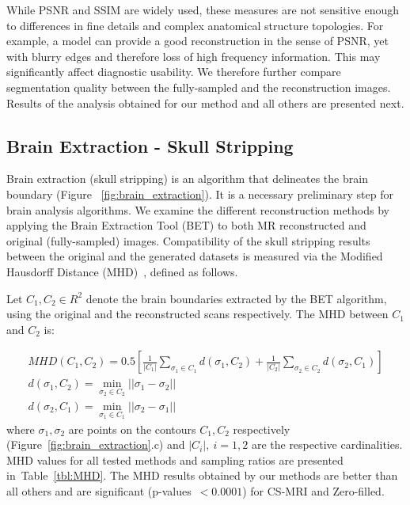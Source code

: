 \documentclass[review]{elsarticle}
\begin{document}
While PSNR and SSIM are widely used, these measures are not sensitive enough to differences in fine details and complex anatomical structure topologies. For example, a model can provide a good reconstruction in the sense of PSNR, yet with blurry edges and therefore loss of high frequency information. This may significantly affect diagnostic usability. We therefore further compare segmentation quality between the fully-sampled and the reconstruction images. Results of the analysis obtained for our method and all others are presented next.

\subsection{Brain Extraction - Skull Stripping}
Brain extraction (skull stripping) is an algorithm that delineates the brain boundary (Figure~ \ref{fig:brain_extraction}). It is a necessary preliminary step for brain analysis algorithms.
We examine the different reconstruction methods by applying the Brain Extraction Tool (BET) \cite{smith2002fast} to both MR reconstructed and original (fully-sampled) images. Compatibility of the skull stripping results between the original and the generated datasets is measured via the Modified Hausdorff Distance (MHD)~\cite{dubuisson1994modified}, defined as follows.

Let $C_1,C_2\in R^2$ denote the brain boundaries extracted by the BET algorithm, using the original and the reconstructed scans respectively. The MHD between $C_1$ and $C_2$ is:

\begin{equation}
\begin{array}{cc}
MHD(C_1,C_2) = 0.5 \left[{\frac{1}{|C_1|} \sum_{\sigma_{1}\in C_1}^{}d(\sigma_1,C_2) + \frac{1}{|C_2|} \sum_{\sigma_{2}\in C_2}^{}d(\sigma_2,C_1)}\right] \\
d(\sigma_1,C_2) = \underset{\sigma_{2}\in C_{2}}{\min}||\sigma_1-\sigma_2|| \\
d(\sigma_2,C_1) = \underset{\sigma_{1}\in C_{1}}{\min}||\sigma_2-\sigma_1||
\end{array}
\end{equation}
where $\sigma_1,\sigma_2$ are points on the contours $C_1,C_2$ respectively (Figure~\ref{fig:brain_extraction}.c) and $|C_i|,~i=1,2$ are the respective cardinalities. MHD values for all tested methods and sampling ratios are presented in~Table~\ref{tbl:MHD}. The MHD results obtained by our methods are better than all others and are significant (p-values~$<0.0001$) for CS-MRI and Zero-filled.
\end{document}
